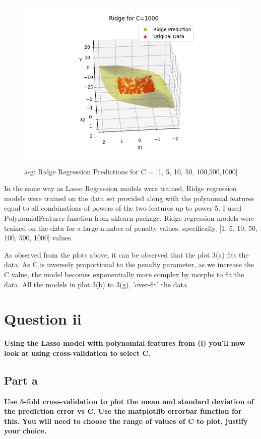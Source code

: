 \documentclass[10pt]{article}
\begin{document}
\begin{figure}[H]
\begin{center}
    \includegraphics[scale=0.4]{./images/Figure_3_1000.png}
    \caption{a-g: Ridge Regression Predictions for C = [1, 5, 10, 50, 100,500,1000]}
  \end{center}
\end{figure}

In the same way as Lasso Regression models were trained, Ridge regression models were trained on the data set provided along with the polynomial features equal
to all combinations of powers of the two features up to power 5. I used PolynomialFeatures function from sklearn package.
Ridge regression models were trained on the data for a large number of penalty values, specifically, [1, 5, 10, 50, 100, 500,
    1000] values.

As observed from the plots above, it can be observed that the plot 3(a) fits the data. As C is inversely proportional to the penalty parameter, as we increase the C value, the model becomes exponentially more complex by morphs to fit the data. All the models in plot 3(b) to 3(g), 'over-fit' the data.

\section*{Question ii}
\textbf{Using the Lasso model with polynomial features from (i) you’ll now look at using
  cross-validation to select C.}

\subsection*{Part a}
\textbf{Use 5-fold cross-validation to plot the mean and standard deviation of the prediction error vs C. Use the matplotlib errorbar function for this. You will need
  to choose the range of values of C to plot, justify your choice.}
\end{document}
